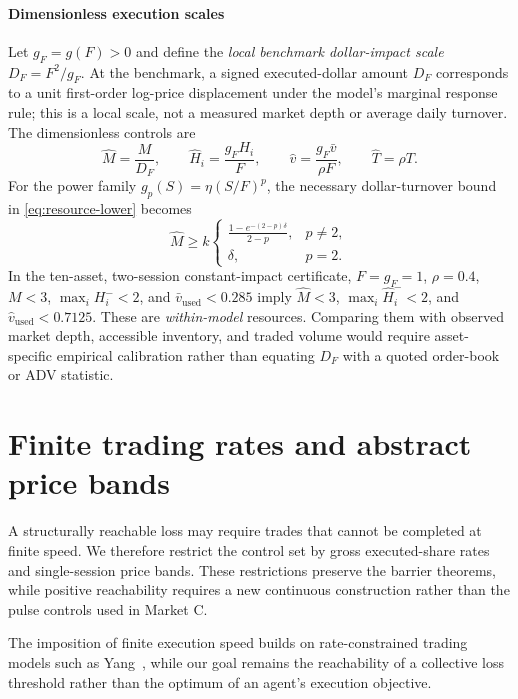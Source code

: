 \documentclass[review,hidelinks,onefignum,onetabnum]{siamonline250211}
\begin{document}
\paragraph{Dimensionless execution scales}
Let $g_F=g(F)>0$ and define the \emph{local benchmark dollar-impact scale} $D_F=F^2/g_F$. At the benchmark, a signed executed-dollar amount $D_F$ corresponds to a unit first-order log-price displacement under the model's marginal response rule; this is a local scale, not a measured market depth or average daily turnover. The dimensionless controls are
\[
\widehat M=\frac{M}{D_F},\qquad
\widehat H_i=\frac{g_F H_i}{F},\qquad
\widehat v=\frac{g_F\bar v}{\rho F},\qquad
\widehat T=\rho T.
\]
For the power family $g_p(S)=\eta(S/F)^p$, the necessary dollar-turnover bound in \eqref{eq:resource-lower} becomes
\[
\widehat M\ge k\begin{cases}
\displaystyle\frac{1-e^{-(2-p)\delta}}{2-p},&p\ne2,\\[4pt]
\delta,&p=2.
\end{cases}
\]
In the ten-asset, two-session constant-impact certificate, $F=g_F=1$, $\rho=0.4$, $M<3$, $\max_iH_i^-<2$, and $\bar v_{\mathrm{used}}<0.285$ imply $\widehat M<3$, $\max_i\widehat H_i^-<2$, and $\widehat v_{\mathrm{used}}<0.7125$. These are \emph{within-model} resources. Comparing them with observed market depth, accessible inventory, and traded volume would require asset-specific empirical calibration rather than equating $D_F$ with a quoted order-book or ADV statistic.


\section{Finite trading rates and abstract price bands}\label{sec:rateband}
A structurally reachable loss may require trades that cannot be completed at finite speed. We therefore restrict the control set by gross executed-share rates and single-session price bands. These restrictions preserve the barrier theorems, while positive reachability requires a new continuous construction rather than the pulse controls used in Market C.

The imposition of finite execution speed builds on rate-constrained trading models such as Yang~\citep{Yang2019}, while our goal remains the reachability of a collective loss threshold rather than the optimum of an agent's execution objective.
\end{document}
